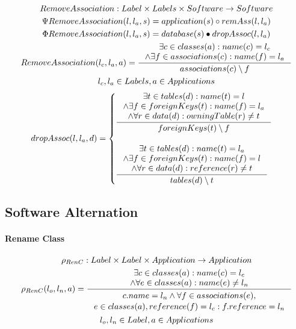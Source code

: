 \documentclass[11pt]{article}
\begin{document}
\begin{gather*}
RemoveAssociation : Label \times Labels \times Software \rightarrow Software \\ 
\Psi RemoveAssociation(l, l_a, s) = application(s) \circ remAss(l, l_a) \\
\Phi RemoveAssociation(l, l_a, s) = database(s) \bullet dropAssoc(l, l_a) \\
RemoveAssociation(l_c, l_a, a) = \inference{\exists c \in classes(a) : name(c) = l_c \\ \wedge \exists f \in associations(c) : name(f) = l_a }{associations(c) \setminus f} \\
l_c, l_a \in Labels, a \in Applications
\end{gather*}
\begin{gather*}
dropAssoc(l, l_a, d) =  \begin{cases}
 \inference{\exists t \in tables(d) : name(t) = l
 \\ \wedge \exists f \in foreignKeys(t) : name(f) = l_a
 \\ \wedge \forall r \in data(d) : owningTable(r) \neq t}{ foreignKeys(t) \setminus f }
 \\ \\
 \inference{\exists t \in tables(d) : name(t) = l_a
 \\ \wedge \exists f \in foreignKeys(t) : name(f) = l
 \\ \wedge \forall r \in data(d) : reference(r) \neq t}{ tables(d) \setminus t}
 \end{cases}
\end{gather*}



\subsection{Software Alternation}
\paragraph{Rename Class}
\begin{gather*}
\rho_{RenC} : Label \times Label \times Application \rightarrow Application \\ 
\rho_{RenC}(l_o, l_n, a) = \inference{\exists c \in classes(a) : name(c) = l_c \\ \wedge \forall e \in classes(a) : name(e) \neq l_n}{\begin{gathered}
c.name = l_n \wedge \forall f \in associations(e), \\ e \in classes(a), reference(f) = l_c : f.reference = l_n 
\end{gathered}}\\
l_o, l_n \in Label, a \in Applications
\end{gather*}
\end{document}

